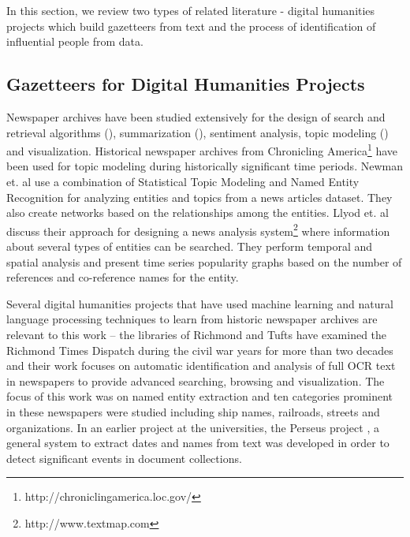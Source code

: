 In this section, we review two types of related literature - digital humanities projects which build gazetteers from text and the process of identification of influential people from data.

\subsection{Gazetteers for Digital Humanities Projects}
Newspaper archives have been studied extensively for the design of search and retrieval algorithms (\cite{Shahaf_11, Gabrilovich_04a, Alonso_10, Khurdiya_11}), summarization (\cite{McKeown95, Otterbacher06, Radev97,Radev01,Radev05 }), sentiment analysis, topic modeling (\cite{Masand_92, Nallapati_04a, Radev99c}) and visualization.
Historical newspaper archives from Chronicling America\footnote{http://chroniclingamerica.loc.gov/} have been used for topic modeling during historically significant time periods\cite{yang2011topic}. Newman et. al\cite{newman2006analyzing} use a combination of Statistical Topic Modeling and Named Entity Recognition for analyzing entities and topics from a news articles dataset. They also create networks based on the relationships among the entities.
Llyod et. al \cite{lloyd2005lydia} discuss their approach for designing a news analysis system\footnote{http://www.textmap.com} where information about several types of entities can be searched. They perform temporal and spatial analysis and present time series popularity graphs based on the number of references and co-reference names for the entity. %

Several digital humanities projects that have used machine learning and natural language processing techniques to learn from historic newspaper archives are relevant to this work -- the libraries of Richmond and Tufts have examined the Richmond Times Dispatch during the civil war years for more than two decades and their work focuses on automatic identification and analysis of full OCR text in newspapers to provide advanced searching, browsing and visualization\cite{crane2006challenge}. The focus of this work was on named entity extraction and ten categories prominent in these newspapers were studied including ship names, railroads, streets and organizations. In an earlier project at the universities, the Perseus project \cite{smith2002detectinga, smith2002detectingb, smith2001disambiguating}, a general system to extract dates and names from text was developed in order to detect significant events in document collections. 


